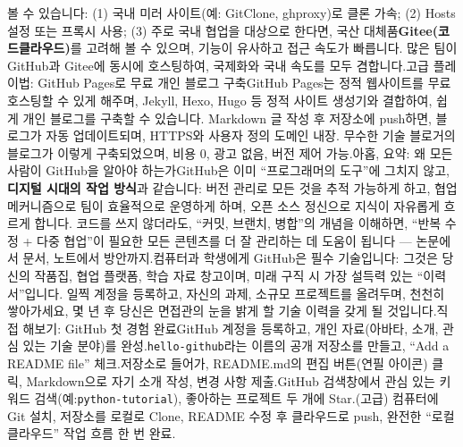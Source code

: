 볼 수 있습니다: (1) 국내 미러 사이트(예: GitClone, ghproxy)로 클론 가속; (2) Hosts 설정 또는 프록시 사용; (3) 주로 국내 협업을 대상으로 한다면, 국산 대체품\textbf{Gitee(코드클라우드)}를 고려해 볼 수 있으며, 기능이 유사하고 접근 속도가 빠릅니다. 많은 팀이 GitHub과 Gitee에 동시에 호스팅하여, 국제화와 국내 속도를 모두 겸합니다.고급 플레이법: GitHub Pages로 무료 개인 블로그 구축GitHub Pages는 정적 웹사이트를 무료 호스팅할 수 있게 해주며, Jekyll, Hexo, Hugo 등 정적 사이트 생성기와 결합하여, 쉽게 개인 블로그를 구축할 수 있습니다. Markdown 글 작성 후 저장소에 push하면, 블로그가 자동 업데이트되며, HTTPS와 사용자 정의 도메인 내장. 무수한 기술 블로거의 블로그가 이렇게 구축되었으며, 비용 0, 광고 없음, 버전 제어 가능.아홉, 요약: 왜 모든 사람이 GitHub을 알아야 하는가GitHub은 이미 “프로그래머의 도구”에 그치지 않고,\textbf{디지털 시대의 작업 방식}과 같습니다: 버전 관리로 모든 것을 추적 가능하게 하고, 협업 메커니즘으로 팀이 효율적으로 운영하게 하며, 오픈 소스 정신으로 지식이 자유롭게 흐르게 합니다. 코드를 쓰지 않더라도, “커밋, 브랜치, 병합”의 개념을 이해하면, “반복 수정 + 다중 협업”이 필요한 모든 콘텐츠를 더 잘 관리하는 데 도움이 됩니다 — 논문에서 문서, 노트에서 방안까지.컴퓨터과 학생에게 GitHub은 필수 기술입니다: 그것은 당신의 작품집, 협업 플랫폼, 학습 자료 창고이며, 미래 구직 시 가장 설득력 있는 “이력서”입니다. 일찍 계정을 등록하고, 자신의 과제, 소규모 프로젝트를 올려두며, 천천히 쌓아가세요, 몇 년 후 당신은 면접관의 눈을 밝게 할 기술 이력을 갖게 될 것입니다.직접 해보기: GitHub 첫 경험 완료GitHub 계정을 등록하고, 개인 자료(아바타, 소개, 관심 있는 기술 분야)를 완성.\texttt{hello-\allowbreak github}라는 이름의 공개 저장소를 만들고, “Add a README file” 체크.저장소로 들어가, README.md의 편집 버튼(연필 아이콘) 클릭, Markdown으로 자기 소개 작성, 변경 사항 제출.GitHub 검색창에서 관심 있는 키워드 검색(예:\texttt{python-\allowbreak tutorial}), 좋아하는 프로젝트 두 개에 Star.(고급) 컴퓨터에 Git 설치, 저장소를 로컬로 Clone, README 수정 후 클라우드로 push, 완전한 “로컬클라우드” 작업 흐름 한 번 완료.
